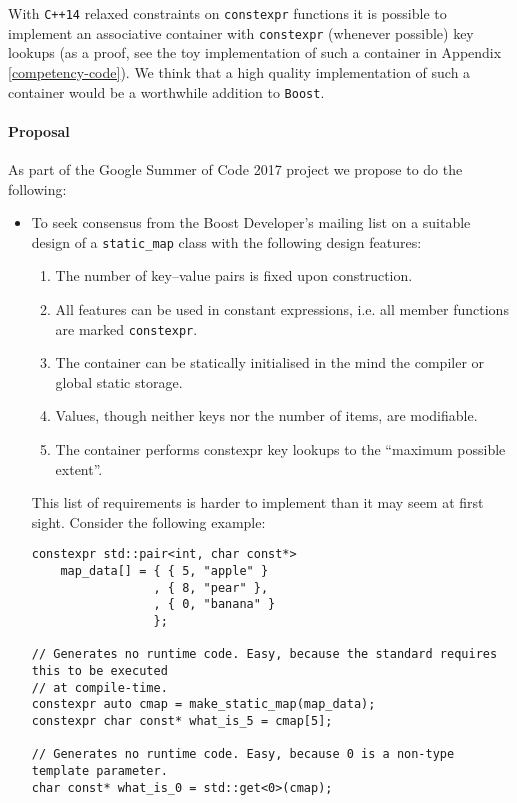 \documentclass[a4paper,12pt]{article}
\begin{document}
    With \texttt{C++14} relaxed constraints on \texttt{constexpr} functions it is possible to implement an associative container with \texttt{constexpr} (whenever possible) key lookups (as a proof, see the toy implementation of such a container in Appendix \ref{competency-code}). We think that a high quality implementation of such a container would be a worthwhile addition to \texttt{Boost}.



    \paragraph{Proposal} As part of the Google Summer of Code 2017 project we propose to do the following:
    \begin{itemize}
    \item To seek consensus from the Boost Developer's mailing list on a suitable design of a \texttt{static\_map} class with the following design features:
        \begin{enumerate}
        \item The number of key--value pairs is fixed upon construction.
        \item All features can be used in constant expressions, i.e. all member functions are marked \texttt{constexpr}.
        \item The container can be statically initialised in the mind the compiler or global static storage.
        \item Values, though neither keys nor the number of items, are modifiable.
        \item The container performs constexpr key lookups to the ``maximum possible extent''.
        \end{enumerate}

        This list of requirements is harder to implement than it may seem at first sight. Consider the
        following example:

\begin{spacing}{0.8}
\begin{lstlisting}
constexpr std::pair<int, char const*> 
    map_data[] = { { 5, "apple" }
                 , { 8, "pear" },
                 , { 0, "banana" }
                 };

// Generates no runtime code. Easy, because the standard requires this to be executed 
// at compile-time.
constexpr auto cmap = make_static_map(map_data);
constexpr char const* what_is_5 = cmap[5];

// Generates no runtime code. Easy, because 0 is a non-type template parameter.
char const* what_is_0 = std::get<0>(cmap);


\end{lstlisting}
\end{spacing}
\end{itemize}
\end{document}
